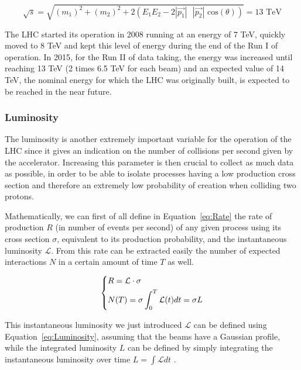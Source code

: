 \documentclass[a4paper, 10pt, openright]{report}
\begin{document}
\begin{equation}
\label{eq:CMEnergy}
\sqrt{s} = \sqrt{(m_1)^2 + (m_2)^2 + 2 \left (E_1 E_2-2 |\overrightarrow{p_1}| \text{ } |\overrightarrow{p_2}| \text{ cos}(\theta) \right )} = 13 \text{ TeV}
\end{equation}

The LHC started its operation in 2008 running at an energy of 7 TeV, quickly moved to 8 TeV and kept this level of energy during the end of the Run I of operation. In 2015, for the Run II of data taking, the energy was increased until reaching 13 TeV (2 times 6.5 TeV for each beam) and an expected value of 14 TeV, the nominal energy for which the \ac{LHC} was originally built, is expected to be reached in the near future.

\subsubsection{Luminosity} \label{subsection:Lumi}

The luminosity is another extremely important variable for the operation of the \ac{LHC} since it gives an indication on the number of collisions per second given by the accelerator. Increasing this parameter is then crucial to collect as much data as possible, in order to be able to isolate processes having a low production cross section and therefore an extremely low probability of creation when colliding two protons.

Mathematically, we can first of all define in Equation~\ref{eq:Rate} the rate of production $R$ (in number of events per second) of any given process using its cross section $\sigma$, equivalent to its production probability, and the instantaneous luminosity $\mathcal{L}$. From this rate can be extracted easily the number of expected interactions $N$ in a certain amount of time $T$ as well. 

\begin{equation}
\label{eq:Rate}
\begin{dcases}
R = \mathcal{L} \cdot \sigma \\
N(T) = \sigma \int_0^T \mathcal{L}(t) dt = \sigma L
\end{dcases}
\end{equation}

This instantaneous luminosity we just introduced $\mathcal{L}$ can be defined using Equation~\ref{eq:Luminosity}, assuming that the beams have a Gaussian profile, while the integrated luminosity $L$ can be defined by simply integrating the instantaneous luminosity over time $L = \int \mathcal{L}dt$ \cite{Thomson}.
\end{document}
